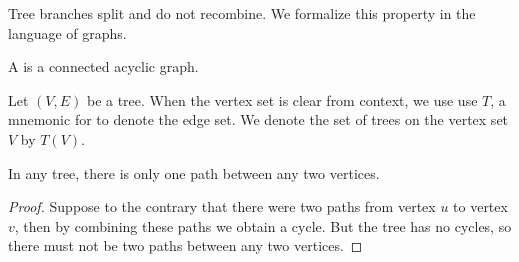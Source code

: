 
\sbasic






\sstart
{}


Tree branches split
and do not recombine.
We formalize this
property in the
language of graphs.


A
is a
connected
acyclic graph.


Let $(V, E)$ be a tree.
When the vertex set is clear
from context, we use
use $T$, a mnemonic for 
to denote the edge set.
We denote the set of trees
on the vertex set $V$ by
$T(V)$.


\begin{prop}
  In any tree,
  there is only one
  path between
  any two vertices.

\begin{proof}
  Suppose to the contrary that
  there were two paths from
  vertex $u$ to vertex $v$,
  then by combining these paths
  we obtain a cycle. But the
  tree has no cycles,
  so there must not be two paths
  between any two vertices.
\end{proof}
\end{prop}
\strats
